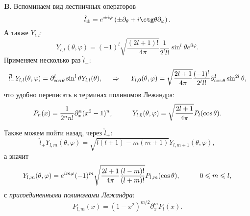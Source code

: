\textbf{B}.
Вспоминаем вид лестничных операторов
\begin{equation*}
    \hat{l}_{\pm} = e^{\pm i \varphi} \left(
        \pm \partial_\theta + i \ctg \theta \partial_\varphi
    \right).
\end{equation*}
А также $Y_{l,l}$:
\begin{equation*}
    Y_{l,l} (\theta, \varphi) = (-1)^l \sqrt{\frac{(2l+1)!}{4 \pi}} \frac{1}{2^l l!} \sin^l \theta e^{i l \varphi}.
\end{equation*}
Применяем несколько раз $\hat{l}_-$:
\begin{equation*}
    \hat{l}_-^l Y_{l,l} (\theta, \varphi) = \partial_{\cos \theta}^l \sin^l \theta Y_{l,l} (\theta),
    \hspace{0.5cm} \Rightarrow \hspace{0.5cm}   
    Y_{l,0} (\theta, \varphi) = \sqrt{\frac{2l + 1}{4 \pi}} \frac{(-1)^l}{2^l l!} \partial_{\cos \theta}^l \sin^{2l} \theta,
\end{equation*}
что удобно переписать в терминах полиномов Лежандра:
\begin{equation*}
    P_n (x) = \frac{1}{2^n n!} \partial_x^n (x^2-1)^n,
    \hspace{10 mm} 
    Y_{l,0} (\theta, \varphi) = \sqrt{\frac{2l+1}{4 \pi}} P_l (\cos \theta).
\end{equation*}


Также можем пойти назад, через $\hat{l}_+$:
\begin{equation*}
    \hat{l}_+ Y_{l,m} (\theta, \varphi) = \sqrt{l (l+1) - m (m+1)} Y_{l, m+1} (\theta, \varphi),
\end{equation*}
а значит
\begin{equation*}
    Y_{l,m} (\theta, \varphi) = e^{i m \varphi} (-1)^m 
    \sqrt{\frac{2l+1}{4 \pi} \frac{(l-m)!}{(l+m)!}} P_{l,m} (\cos \theta), \hspace{5 mm} 
    \hspace{5 mm} 0 \leq m \leq l,
\end{equation*}
с \textit{присоединенными полиномами Лежандра}:
\begin{equation*}
    P_{l,m} (x) = (1-x^2)^{m/2} \partial_x^m P_l (x).
\end{equation*}


